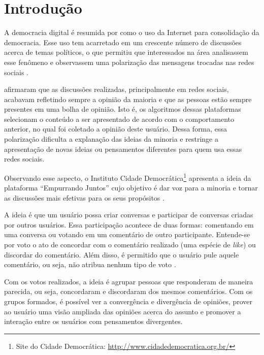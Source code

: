 \chapter[Introdução]{Introdução} \label{cap:introducao}

A democracia digital é resumida por  como o uso da Internet para consolidação da democracia.
Esse uso tem acarretado em um crescente número de discussões acerca de temas políticos, o que permitiu que interessados na área analisassem 
esse fenômeno e observassem uma polarização das mensagens trocadas nas redes sociais \cite{empurrandojuntos}.

 afirmaram que as discussões realizadas, principalmente em redes sociais, 
acabavam refletindo sempre a opinião da maioria e que as pessoas estão sempre presentes em uma bolha de opinião. 
Isto é, os algoritmos dessas plataformas selecionam o conteúdo a ser apresentado de acordo com o comportamento anterior,
no qual foi coletado a opinião deste usuário.
Dessa forma, essa polarização dificulta a explanação das ideias da minoria e restringe a apresentação de novas ideias ou pensamentos diferentes 
para quem usa essas redes sociais. 

Observando esse aspecto, o Instituto Cidade Democrática\footnote{Site do Cidade Democrática: \url{http://www.cidadedemocratica.org.br/}} apresenta a ideia da plataforma ``Empurrando Juntos'' cujo objetivo 
é dar voz para a minoria e tornar as discussões mais efetivas para os seus propósitos \cite{empurrandojuntos}.

A ideia é que um usuário possa criar conversas e participar de conversas criadas por outros usuários. Essa participação 
acontece de duas formas: comentando em uma conversa ou votando em um comentário de outro participante. Entende-se por voto
o ato de concordar com o comentário realizado (uma espécie de \textit{like}) ou discordar do comentário. Além disso, é permitido
que o usuário pule aquele comentário, ou seja, não atribua nenhum tipo de voto \cite{empurrandojuntos}. 

Com os votos realizados, a ideia é agrupar pessoas que responderam de maneira parecida, ou seja, concordaram e
discordaram dos mesmos comentários. Com os grupos formados, é possível ver a convergência e divergência de opiniões, 
prover ao usuário uma visão ampliada das opiniões acerca do assunto e promover a interação entre os usuários com 
pensamentos divergentes.

